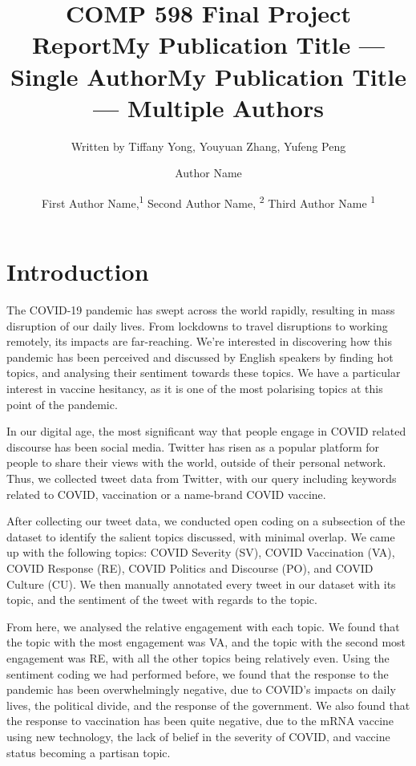 \documentclass[letterpaper]{article} %
\title{COMP 598 Final Project Report}
\author{
    Written by Tiffany Yong, Youyuan Zhang, Yufeng Peng
}
\title{My Publication Title --- Single Author}
\author {
    Author Name
}
\title{My Publication Title --- Multiple Authors}
\author {
    First Author Name,\textsuperscript{\rm 1}
    Second Author Name, \textsuperscript{\rm 2}
    Third Author Name \textsuperscript{\rm 1}
}
\begin{document}
\maketitle


\section{Introduction}
The COVID-19 pandemic has swept across the world rapidly, resulting in mass disruption of our daily lives. From lockdowns to travel disruptions to working remotely, its impacts are far-reaching. We're interested in discovering how this pandemic has been perceived and discussed by English speakers by finding hot topics, and analysing their sentiment towards these topics. We have a particular interest in vaccine hesitancy, as it is one of the most polarising topics at this point of the pandemic. \par
In our digital age, the most significant way that people engage in COVID related discourse has been social media. Twitter has risen as a popular platform for people to share their views with the world, outside of their personal network. Thus, we collected tweet data from Twitter, with our query including keywords related to COVID, vaccination or a name-brand COVID vaccine. \par
After collecting our tweet data, we conducted open coding on a subsection of the dataset to identify the salient topics discussed, with minimal overlap. We came up with the following topics: COVID Severity (SV), COVID Vaccination (VA), COVID Response (RE), COVID Politics and Discourse (PO), and COVID Culture (CU). We then manually annotated every tweet in our dataset with its topic, and the sentiment of the tweet with regards to the topic. \par
From here, we analysed the relative engagement with each topic. We found that the topic with the most engagement was VA, and the topic with the second most engagement was RE, with all the other topics being relatively even. Using the sentiment coding we had performed before, we found that the response to the pandemic has been overwhelmingly negative, due to COVID's impacts on daily lives, the political divide, and the response of the government. We also found that the response to vaccination has been quite negative, due to the mRNA vaccine using new technology, the lack of belief in the severity of COVID, and vaccine status becoming a partisan topic.  
\end{document}
